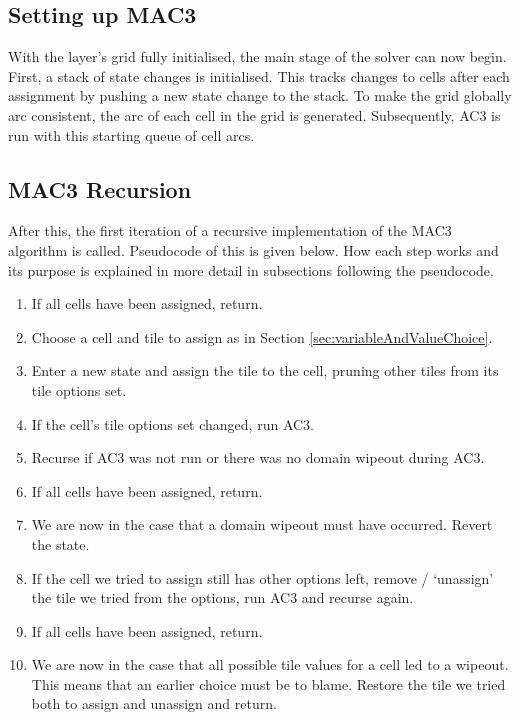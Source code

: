 \subsection{Setting up MAC3}
With the layer's grid fully initialised, the main stage of the solver can now begin. First, a stack of state changes is initialised. This tracks changes to cells after each assignment by pushing a new state change to the stack. To make the grid globally arc consistent, the arc of each cell in the grid is generated. Subsequently, AC3 is run with this starting queue of cell arcs.

\subsection{MAC3 Recursion}
After this, the first iteration of a recursive implementation of the MAC3 algorithm is called. Pseudocode of this is given below. How each step works and its purpose is explained in more detail in subsections following the pseudocode.

\begin{enumerate}
    \item If all cells have been assigned, return.
    \item Choose a cell and tile to assign as in Section \ref{sec:variableAndValueChoice}.
    \item Enter a new state and assign the tile to the cell, pruning other tiles from its tile options set.
    \item If the cell's tile options set changed, run AC3.
    \item Recurse if AC3 was not run or there was no domain wipeout during AC3.
    \item If all cells have been assigned, return.
    \item We are now in the case that a domain wipeout must have occurred. Revert the state.
    \item If the cell we tried to assign still has other options left, remove / `unassign' the tile we tried from the options, run AC3 and recurse again.
    \item If all cells have been assigned, return.
    \item We are now in the case that all possible tile values for a cell led to a wipeout. This means that an earlier choice must be to blame. Restore the tile we tried both to assign and unassign and return.
\end{enumerate}

